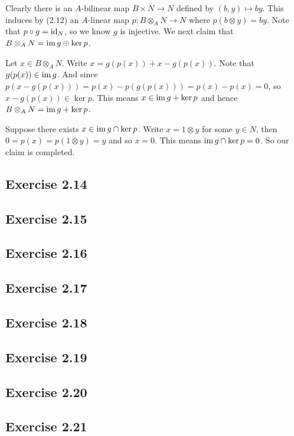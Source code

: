 \documentclass[../A&M.tex]{subfiles}
\begin{document}
Clearly there is an $A$-bilinear map $B \times N \to N$ defined by $(b,y)\mapsto by$. This induces by (2.12) an $A$-linear map $p: B \otimes_A N \to N$ where $p(b\otimes y) = by$. Note that $p\circ g = \operatorname{id}_N$, so we know $g$ is injective. We next claim that $B \otimes_A N = \operatorname{im} g \oplus \ker p$.

Let $x\in B \otimes_A N$. Write $x = g(p(x)) + x - g(p(x))$. Note that $g(p(x)) \in \operatorname{im} g$. And since $p(x - g(p(x))) = p(x) - p(g(p(x))) = p(x) - p(x) = 0$, so $x - g(p(x)) \in \ker p$. This means $x \in \operatorname{im} g + \ker p$ and hence $B \otimes_A N = \operatorname{im} g + \ker p$.

Suppose there exists $x \in \operatorname{im} g \cap \ker p$. Write $x = 1 \otimes y$ for some $y\in N$, then $0 = p(x) = p(1 \otimes y) = y$ and so $x = 0$. This means $\operatorname{im} g \cap \ker p = 0$. So our claim is completed.

\subsection*{Exercise 2.14}

\subsection*{Exercise 2.15}

\subsection*{Exercise 2.16}

\subsection*{Exercise 2.17}

\subsection*{Exercise 2.18}

\subsection*{Exercise 2.19}

\subsection*{Exercise 2.20}

\subsection*{Exercise 2.21}
\end{document}
